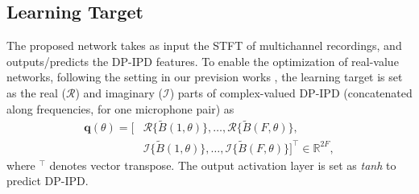 \documentclass[lettersize,journal]{IEEEtran}
\begin{document}
\subsection{Learning Target}
The proposed network takes as input the STFT of multichannel recordings, and outputs/predicts the DP-IPD features. To enable the optimization of real-value networks, following the setting in our prevision works \cite{yang2021learning,Yang2022SRPDNNLD,WYBIS23}, the learning target is set as the real ($\mathcal{R}$) and imaginary ($\mathcal{I}$) parts of complex-valued DP-IPD (concatenated along frequencies, for one microphone pair) as
\begin{equation}
\begin{aligned}
\mathbf{q}(\theta)= 
 [&\mathcal{R}\{\tilde{B}(1, \theta)\}, \ldots, \mathcal{R} \{\tilde{B}(F, \theta)\}, \\
& \mathcal{I} \{\tilde{B}(1, \theta)\}, \ldots, \mathcal{I} \{ \tilde{B}(F, \theta)\}]^{\top} \in \mathbb{R}^{2 F},
\end{aligned}
\end{equation}
where $^{\top}$ denotes vector transpose. The output activation layer is set as \emph{tanh} to predict DP-IPD. 
\end{document}
